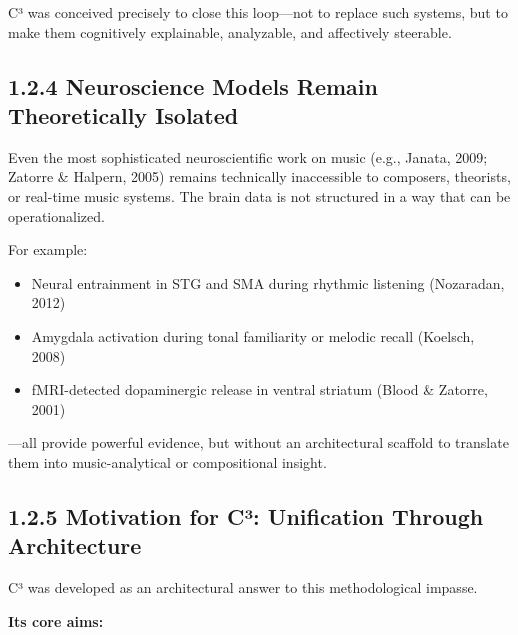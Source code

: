 \documentclass[10pt]{article}
\begin{document}
C³ was conceived precisely to close this loop—not to replace such systems, but to make them cognitively explainable, analyzable, and affectively steerable.

\subsection*{1.2.4 Neuroscience Models Remain Theoretically Isolated}

Even the most sophisticated neuroscientific work on music (e.g., Janata, 2009; Zatorre \& Halpern, 2005) remains technically inaccessible to composers, theorists, or real-time music systems. The brain data is not structured in a way that can be operationalized.

For example:

\begin{itemize}
    \item Neural entrainment in STG and SMA during rhythmic listening (Nozaradan, 2012)
    \item Amygdala activation during tonal familiarity or melodic recall (Koelsch, 2008)
    \item fMRI-detected dopaminergic release in ventral striatum (Blood \& Zatorre, 2001)
\end{itemize}

—all provide powerful evidence, but without an architectural scaffold to translate them into music-analytical or compositional insight.

\subsection*{1.2.5 Motivation for C³: Unification Through Architecture}

C³ was developed as an architectural answer to this methodological impasse.

\textbf{Its core aims:}
\end{document}
